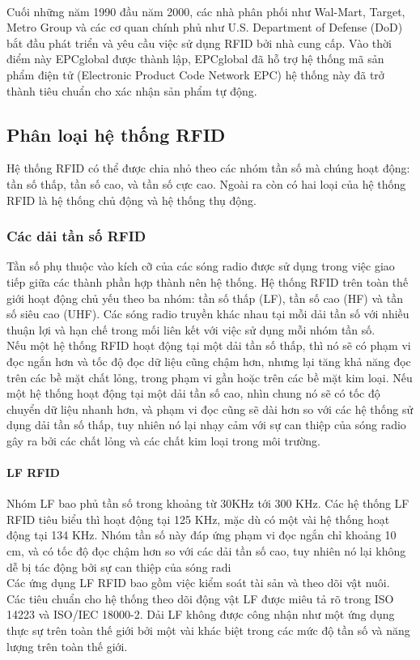 \\
Cuối những năm 1990 đầu năm 2000, các nhà phân phối như Wal-Mart, Target, Metro Group và các cơ quan chính phủ như U.S. Department of Defense (DoD) bắt đầu phát triển và yêu cầu việc sử dụng RFID bởi nhà cung cấp. Vào thời điểm này EPCglobal được thành lập, EPCglobal đã hỗ trợ hệ thống mã sản phẩm điện tử (Electronic Product Code Network EPC) hệ thống này đã trở thành tiêu chuẩn cho xác nhận sản phẩm tự động.
\label{ref{fig2_5}}

\subsection{Phân loại hệ thống RFID}
Hệ thống RFID có thể được chia nhỏ theo các nhóm tần số mà chúng hoạt động: tần số thấp, tần số cao, và tần số cực cao. Ngoài ra còn có hai loại của hệ thống RFID là hệ thống chủ động và hệ thống thụ động.
\label{ref{fig2_6}}
\subsubsection{Các dải tần số RFID}
Tần số phụ thuộc vào kích cỡ của các sóng radio  được sử dụng trong việc giao tiếp giữa các thành phần hợp thành nên hệ thống. Hệ thống RFID trên toàn thế giới hoạt động chủ yếu theo ba nhóm: tần số thấp (LF), tần số cao (HF) và tần số siêu cao (UHF). Các sóng radio truyền khác nhau  tại mỗi dải tần số với nhiều thuận lợi và hạn chế trong mối liên kết với việc sử dụng mỗi nhóm tần số.\\
Nếu một hệ thống RFID hoạt động tại một dải tần số thấp, thì nó sẽ có phạm vi đọc ngắn hơn và tốc độ đọc dữ liệu cũng chậm hơn, nhưng lại tăng khả năng đọc trên các bề mặt chất lỏng, trong phạm vi gần hoặc trên các bề mặt kim loại. Nếu một hệ thống hoạt động tại một dải tần số cao, nhìn chung nó sẽ có tốc độ chuyển dữ liệu nhanh hơn, và phạm vi đọc cũng sẽ dài hơn so với các hệ thống sử dụng dải tần số thấp, tuy nhiên nó lại nhạy cảm với sự can thiệp của sóng radio gây ra bởi các chất lỏng và các chất kim loại trong môi trường.
\paragraph{LF RFID}
Nhóm LF bao phủ tần số trong khoảng từ 30KHz tới 300 KHz. Các hệ thống LF RFID tiêu biểu thì hoạt động tại 125 KHz, mặc dù có một vài hệ thống hoạt động tại 134 KHz. Nhóm tần số này đáp ứng phạm vi đọc ngắn chỉ khoảng 10 cm, và có tốc độ đọc chậm hơn so với các dải tần số cao, tuy nhiên nó lại không dễ bị tác động bởi sự can thiệp của sóng radi\\
Các ứng dụng LF RFID bao gồm việc kiểm soát tài sản và theo dõi vật nuôi.\\
Các tiêu chuẩn cho hệ thống theo dõi động vật LF được miêu tả rõ trong ISO 14223 và ISO/IEC 18000-2.  Dải LF không được công nhận như một ứng dụng thực sự trên toàn thế giới bởi  một vài khác biệt trong các mức độ tần số và  năng lượng trên toàn thế giới.

